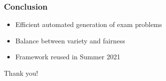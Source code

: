 \documentclass[xcolor={table}]{beamer}
\begin{document}
\begin{frame}
\frametitle{Conclusion}

  \begin{itemize}
    \item Efficient automated generation of exam problems
    \item Balance between variety and fairness
    \item Framework reused in Summer 2021
  \end{itemize}

\bigskip
\bigskip
\pause

\begin{center}
    Thank you!
\end{center}
\end{frame}

\end{document}

